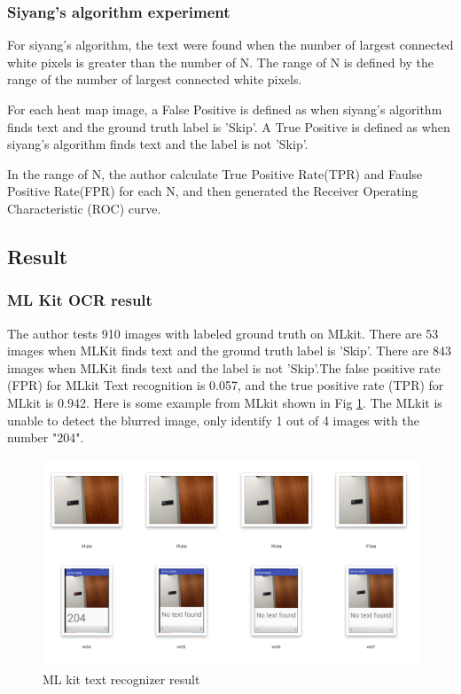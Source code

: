 \documentclass[11pt]{ucscthesis}
\begin{document}
\subsubsection{Siyang's algorithm experiment }
For siyang's algorithm, the text were found when the number of largest connected white pixels is greater than the number of N. The range of N is defined by the range of the number of largest connected white pixels.

For each heat map image, a False Positive is defined as when siyang's algorithm finds text and the ground truth label is 'Skip'. A True Positive is defined as when siyang's algorithm finds text and the label is not 'Skip'.



In the range of N, the author calculate True Positive Rate(TPR) and Faulse Positive Rate(FPR) for each N, and then generated the Receiver Operating Characteristic (ROC) curve.



 
 \subsection{Result}
 \subsubsection{ML Kit OCR result}

 
The author tests 910 images with labeled ground truth on MLkit. There are 53 images when MLKit finds text and the ground truth label is 'Skip'. There are 843 images when MLKit finds text and the label is not 'Skip'.The false positive rate (FPR) for MLkit Text recognition is 0.057, and the true positive rate (TPR) for MLkit is 0.942. Here is some example from MLkit shown in Fig \ref{MLKitrTRR}. The MLkit is unable to detect the blurred image, only identify 1 out of 4 images with the number "204".
 
 
  \begin{figure}
    \centering
    \includegraphics[width =0.8\linewidth]{Fig/MLreult.png}
    \caption{ML kit text recognizer result}
    \label{MLKitrTRR}
\end{figure}
 
\end{document}
